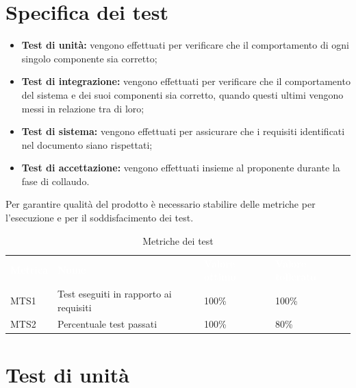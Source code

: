 \section{Specifica dei test}

\begin{itemize}
    \item \textbf{Test di unità:} vengono effettuati per verificare che il comportamento di ogni singolo componente sia corretto;
    \item \textbf{Test di integrazione:} vengono effettuati per verificare che il comportamento del sistema e dei suoi componenti sia corretto, quando questi ultimi vengono messi in relazione tra di loro;
    \item \textbf{Test di sistema:} vengono effettuati per assicurare che i requisiti identificati nel documento \textit{\AdR} siano rispettati;
    \item \textbf{Test di accettazione:} vengono effettuati insieme al proponente durante la fase di collaudo.
\end{itemize}
Per garantire qualità del prodotto è necessario stabilire delle metriche per l’esecuzione e per il soddisfacimento dei test.
\begin{table}[H]
    \renewcommand{\arraystretch}{1.5}
    \begin{tabular}{ m{}<{\centering}  m{}<{\centering}  m{}<{\centering} m{}<{\centering} }
        \rowcolor{darkblue}
        \textcolor{white}{\textbf{Metrica}} &\textcolor{white}{\textbf{Nome}}& \textcolor{white}{\textbf{Valore ottimo}} & \textcolor{white}{\textbf{Valore tollerato}}\\ 
        
        MTS1 & 
        Test eseguiti in rapporto ai requisiti &
        100\% &
        100\% \\

        MTS2 &
        Percentuale test passati &
        100\% &
        80\% \\

    \end{tabular}
    \caption{Metriche dei test}
\end{table}

\section{Test di unità}




